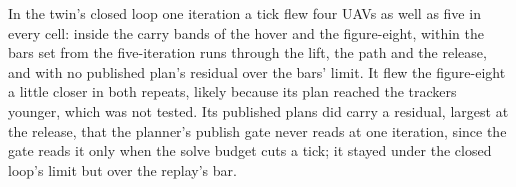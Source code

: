 
In the twin's closed loop one iteration a tick flew four UAVs as well as five in every cell: inside the carry bands of
the hover and the figure-eight, within the bars set from the five-iteration runs through the lift, the path and the
release, and with no published plan's residual over the bars' limit. It flew the figure-eight a little closer in both repeats, likely because its plan
reached the trackers younger, which was not tested. Its published plans did carry a residual, largest at the release,
that the planner's publish gate never reads at one iteration, since the gate reads it only when the solve budget cuts
a tick; it stayed under the closed loop's limit but over the replay's bar.

